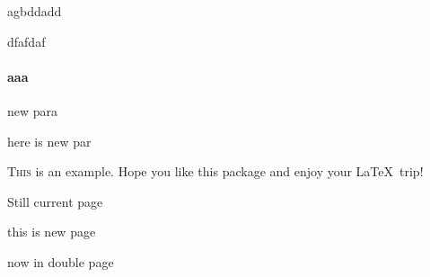 \documentclass[]{ctexart}
\begin{document}
	\noindent agbddadd
	
	dfafdaf
	
	\mbox{}
	
	\par 
	
	\paragraph{aaa}new para
	
	\mbox{}
	
	here is new par
	
	\mbox{}
	
	\lettrine{T}{his} is an example. Hope you like this package and enjoy your \LaTeX\ trip!
	
	
	\mbox{}
	
	Still current page
		
	\newpage
	
	this is new page
	
	\clearpage
	
	\mbox{}
	
	\cleardoublepage
	
	\mbox{}
	
	now in double page
	
	
	
	
\end{document}
